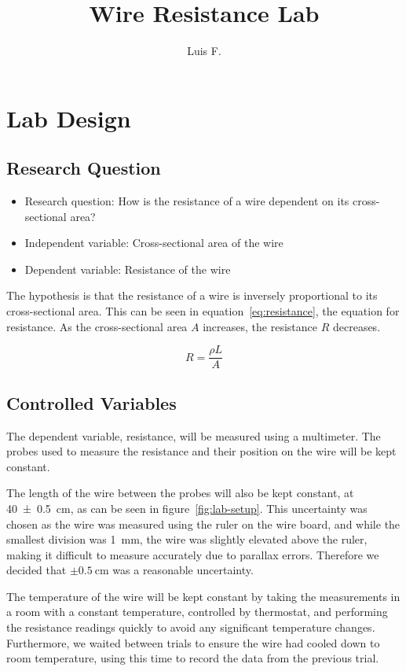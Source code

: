 \documentclass{article}
\author{Luis F.}
\title{Wire Resistance Lab}
\newcommand{\unc}[2]{\(\pm\SI{#1}{#2}\)}
\begin{document}
\maketitle

\section{Lab Design}
\subsection{Research Question}

\begin{itemize}
  \item Research question: How is the resistance of a wire dependent on its cross-sectional area?
  \item Independent variable: Cross-sectional area of the wire
  \item Dependent variable: Resistance of the wire
\end{itemize}

The hypothesis is that the resistance of a wire is inversely proportional to its cross-sectional area. This can be seen in equation~\ref{eq:resistance}, the equation for resistance. As the cross-sectional area \(A\) increases, the resistance \(R\) decreases.

\begin{equation}\label{eq:resistance}
  R = \frac{\rho L}{A}
\end{equation}

\subsection{Controlled Variables}

The dependent variable, resistance, will be measured using a multimeter. The probes used to measure the resistance and their position on the wire will be kept constant.

The length of the wire between the probes will also be kept constant, at \SI{40\pm0.5}{\centi\metre}, as can be seen in figure~\ref{fig:lab-setup}. This uncertainty was chosen as the wire was measured using the ruler on the wire board, and while the smallest division was \SI{1}{\milli\metre}, the wire was slightly elevated above the ruler, making it difficult to measure accurately due to parallax errors. Therefore we decided that \unc{0.5}{\centi\metre} was a reasonable uncertainty.

The temperature of the wire will be kept constant by taking the measurements in a room with a constant temperature, controlled by thermostat, and performing the resistance readings quickly to avoid any significant temperature changes. Furthermore, we waited between trials to ensure the wire had cooled down to room temperature, using this time to record the data from the previous trial.
\end{document}
